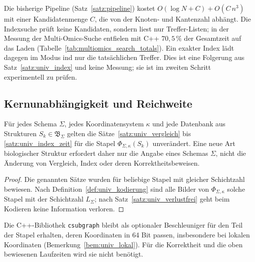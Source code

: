 \begin{bemerkung}
	Die bisherige Pipeline (Satz~\ref{satz:pipeline}) kostet $O(\log N+C)+O(C\,n^3)$ mit einer Kandidatenmenge $C$, die von der Knoten- und Kantenzahl abhängt. Die Indexsuche prüft keine Kandidaten, sondern liest nur Treffer-Listen; in der Messung der Multi-Omics-Suche entfielen mit C++ $70{,}5\,\%$ der Gesamtzeit auf das Laden (Tabelle~\ref{tab:multiomics_search_totals}). Ein exakter Index lädt dagegen im Modus ind nur die tatsächlichen Treffer. Dies ist eine Folgerung aus Satz~\ref{satz:univ_index} und keine Messung; sie ist im zweiten Schritt experimentell zu prüfen.
\end{bemerkung}

\subsection{Kernunabhängigkeit und Reichweite}
\label{sec:univ_reichweite}

\begin{korollar}[Kernunabhängigkeit]
	\label{kor:univ_kern}
	Für jedes Schema $\Sigma$, jedes Koordinatensystem $\kappa$ und jede Datenbank aus Strukturen $S_k\in\mathfrak{B}_\Sigma$ gelten die Sätze~\ref{satz:univ_vergleich} bis \ref{satz:univ_index_zeit} für die Stapel $\Phi_{\Sigma,\kappa}(S_k)$ unverändert. Eine neue Art biologischer Struktur erfordert daher nur die Angabe eines Schemas $\Sigma$, nicht die Änderung von Vergleich, Index oder deren Korrektheitsbeweisen.
\end{korollar}

\begin{proof}
	Die genannten Sätze wurden für beliebige Stapel mit gleicher Schichtzahl bewiesen. Nach Definition~\ref{def:univ_kodierung} sind alle Bilder von $\Phi_{\Sigma,\kappa}$ solche Stapel mit der Schichtzahl $L_\Sigma$; nach Satz~\ref{satz:univ_verlustfrei} geht beim Kodieren keine Information verloren.
\end{proof}

\begin{bemerkung}
	Die C++-Bibliothek \texttt{csubgraph} bleibt als optionaler Beschleuniger für den Teil der Stapel erhalten, deren Koordinaten in 64 Bit passen, insbesondere bei lokalen Koordinaten (Bemerkung~\ref{bem:univ_lokal}). Für die Korrektheit und die oben bewiesenen Laufzeiten wird sie nicht benötigt.
\end{bemerkung}


